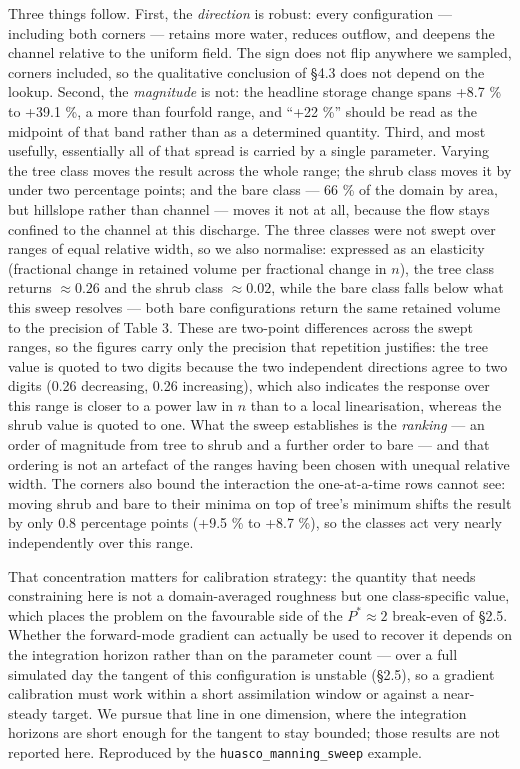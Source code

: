 Three things follow. First, the \emph{direction} is robust: every
configuration --- including both corners --- retains more water, reduces
outflow, and deepens the channel relative to the uniform field. The sign
does not flip anywhere we sampled, corners included, so the qualitative
conclusion of §4.3 does not depend on the lookup. Second, the
\emph{magnitude} is not: the headline storage change spans +8.7 \% to
+39.1 \%, a more than fourfold range, and ``+22 \%'' should be read as
the midpoint of that band rather than as a determined quantity. Third,
and most usefully, essentially all of that spread is carried by a single
parameter. Varying the tree class moves the result across the whole
range; the shrub class moves it by under two percentage points; and the
bare class --- 66 \% of the domain by area, but hillslope rather than
channel --- moves it not at all, because the flow stays confined to the
channel at this discharge. The three classes were not swept over ranges
of equal relative width, so we also normalise: expressed as an
elasticity (fractional change in retained volume per fractional change
in \(n\)), the tree class returns \(\approx 0.26\) and the shrub class
\(\approx 0.02\), while the bare class falls below what this sweep
resolves --- both bare configurations return the same retained volume to
the precision of Table 3. These are two-point differences across the
swept ranges, so the figures carry only the precision that repetition
justifies: the tree value is quoted to two digits because the two
independent directions agree to two digits (0.26 decreasing, 0.26
increasing), which also indicates the response over this range is closer
to a power law in \(n\) than to a local linearisation, whereas the shrub
value is quoted to one. What the sweep establishes is the \emph{ranking}
--- an order of magnitude from tree to shrub and a further order to bare
--- and that ordering is not an artefact of the ranges having been
chosen with unequal relative width. The corners also bound the
interaction the one-at-a-time rows cannot see: moving shrub and bare to
their minima on top of tree's minimum shifts the result by only 0.8
percentage points (+9.5 \% to +8.7 \%), so the classes act very nearly
independently over this range.

That concentration matters for calibration strategy: the quantity that
needs constraining here is not a domain-averaged roughness but one
class-specific value, which places the problem on the favourable side of
the \(P^{*} \approx 2\) break-even of §2.5. Whether the forward-mode
gradient can actually be used to recover it depends on the integration
horizon rather than on the parameter count --- over a full simulated day
the tangent of this configuration is unstable (§2.5), so a gradient
calibration must work within a short assimilation window or against a
near-steady target. We pursue that line in one dimension, where the
integration horizons are short enough for the tangent to stay bounded;
those results are not reported here. Reproduced by the
\texttt{huasco\_manning\_sweep} example.

